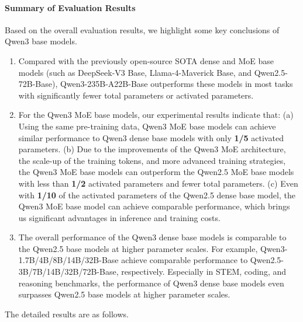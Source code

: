 \documentclass[dvipsnames]{article}
\begin{document}
\paragraph{Summary of Evaluation Results}
Based on the overall evaluation results, we highlight some key conclusions of Qwen3 base models. 
\begin{enumerate}[label=(\arabic*)]
\item Compared with the previously open-source SOTA dense and MoE base models (such as DeepSeek-V3 Base, Llama-4-Maverick Base, and Qwen2.5-72B-Base), Qwen3-235B-A22B-Base outperforms these models in most tasks with significantly fewer total parameters or activated parameters.

\item For the Qwen3 MoE base models, our experimental results indicate that: (a) Using the same pre-training data, Qwen3 MoE base models can achieve similar performance to Qwen3 dense base models with only \textbf{1/5} activated parameters. (b) Due to the improvements of the Qwen3 MoE architecture, the scale-up of the training tokens, and more advanced training strategies, the Qwen3 MoE base models can outperform the Qwen2.5 MoE base models with less than \textbf{1/2} activated parameters and fewer total parameters. (c) Even with \textbf{1/10} of the activated parameters of the Qwen2.5 dense base model, the Qwen3 MoE base model can achieve comparable performance, which brings us significant advantages in inference and training costs.

\item The overall performance of the Qwen3 dense base models is comparable to the Qwen2.5 base models at higher parameter scales. For example, Qwen3-1.7B/4B/8B/14B/32B-Base achieve comparable performance to Qwen2.5-3B/7B/14B/32B/72B-Base, respectively. Especially in STEM, coding, and reasoning benchmarks, the performance of Qwen3 dense base models even surpasses Qwen2.5 base models at higher parameter scales.
\end{enumerate}
The detailed results are as follows.
\end{document}
